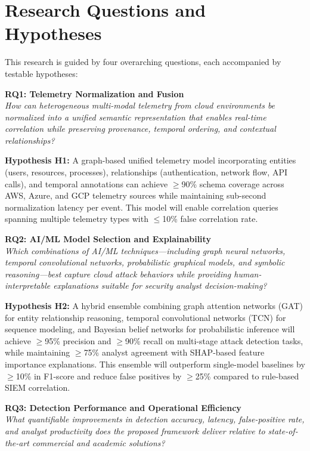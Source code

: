 \section{Research Questions and Hypotheses}\label{sec:intro-rq}
This research is guided by four overarching questions, each accompanied by testable hypotheses:

\textbf{RQ1: Telemetry Normalization and Fusion} \\
\emph{How can heterogeneous multi-modal telemetry from cloud environments be normalized into a unified semantic representation that enables real-time correlation while preserving provenance, temporal ordering, and contextual relationships?}

\textbf{Hypothesis H1:} A graph-based unified telemetry model incorporating entities (users, resources, processes), relationships (authentication, network flow, API calls), and temporal annotations can achieve $\geq$90\% schema coverage across AWS, Azure, and GCP telemetry sources while maintaining sub-second normalization latency per event. This model will enable correlation queries spanning multiple telemetry types with $\leq$10\% false correlation rate.

\textbf{RQ2: AI/ML Model Selection and Explainability} \\
\emph{Which combinations of AI/ML techniques---including graph neural networks, temporal convolutional networks, probabilistic graphical models, and symbolic reasoning---best capture cloud attack behaviors while providing human-interpretable explanations suitable for security analyst decision-making?}

\textbf{Hypothesis H2:} A hybrid ensemble combining graph attention networks (GAT) for entity relationship reasoning, temporal convolutional networks (TCN) for sequence modeling, and Bayesian belief networks for probabilistic inference will achieve $\geq$95\% precision and $\geq$90\% recall on multi-stage attack detection tasks, while maintaining $\geq$75\% analyst agreement with SHAP-based feature importance explanations. This ensemble will outperform single-model baselines by $\geq$10\% in F1-score and reduce false positives by $\geq$25\% compared to rule-based SIEM correlation.

\textbf{RQ3: Detection Performance and Operational Efficiency} \\
\emph{What quantifiable improvements in detection accuracy, latency, false-positive rate, and analyst productivity does the proposed framework deliver relative to state-of-the-art commercial and academic solutions?}

